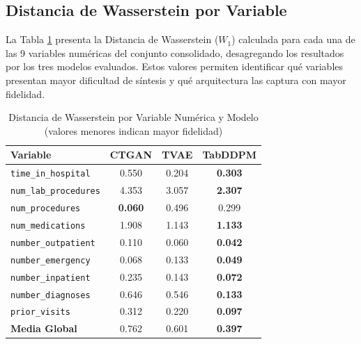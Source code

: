 \subsection{Distancia de Wasserstein por Variable}

La Tabla \ref{tab:wasserstein_detallado} presenta la Distancia de Wasserstein ($W_1$) calculada para cada una de las 9 variables numéricas del conjunto consolidado, desagregando los resultados por los tres modelos evaluados. Estos valores permiten identificar qué variables presentan mayor dificultad de síntesis y qué arquitectura las captura con mayor fidelidad.

\begin{table}[htbp]
\centering
\caption{Distancia de Wasserstein por Variable Numérica y Modelo (valores menores indican mayor fidelidad)}
\label{tab:wasserstein_detallado}
\begin{tabularx}{\textwidth}{>{\raggedright\arraybackslash}X c c c}
\toprule
\textbf{Variable} & \textbf{CTGAN} & \textbf{TVAE} & \textbf{TabDDPM} \\
\midrule
\rowcolor{gray!10} \texttt{time\_in\_hospital} & 0.550 & 0.204 & \textbf{0.303} \\
\texttt{num\_lab\_procedures} & 4.353 & 3.057 & \textbf{2.307} \\
\rowcolor{gray!10} \texttt{num\_procedures} & \textbf{0.060} & 0.496 & 0.299 \\
\texttt{num\_medications} & 1.908 & 1.143 & \textbf{1.133} \\
\rowcolor{gray!10} \texttt{number\_outpatient} & 0.110 & 0.060 & \textbf{0.042} \\
\texttt{number\_emergency} & 0.068 & 0.133 & \textbf{0.049} \\
\rowcolor{gray!10} \texttt{number\_inpatient} & 0.235 & 0.143 & \textbf{0.072} \\
\texttt{number\_diagnoses} & 0.646 & 0.546 & \textbf{0.133} \\
\rowcolor{gray!10} \texttt{prior\_visits} & 0.312 & 0.220 & \textbf{0.097} \\
\midrule
\textbf{Media Global} & 0.762 & 0.601 & \textbf{0.397} \\
\bottomrule
\end{tabularx}
\end{table}

